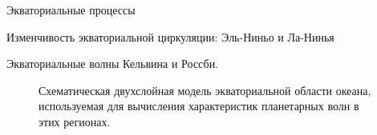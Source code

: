 \begin{chapter}{Экваториальные процессы}
\begin{section}{Изменчивость экваториальной циркуляции: Эль-Ниньо и Ла-Нинья}
\begin{paragraph}{Экваториальные волны Кельвина и Россби.}
\begin{figure}[t!]
\begin{center}
\end{center}
\caption{Схематическая двухслойная модель экваториальной области океана,
используемая для вычисления характеристик планетарных волн в этих 
регионах.~\cite[стр.~107]{Philander:1990}}
\label{fig:modelsketch}
\end{figure}
%


\end{paragraph}
\end{section}
\end{chapter}
